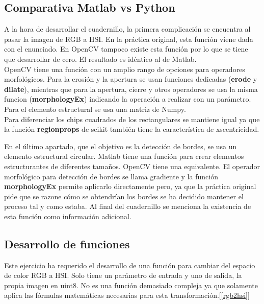 \documentclass[a4paper,12pt]{report}
\begin{document}
\subsection{Comparativa Matlab vs Python}

A la hora de desarrollar el cuadernillo, la primera complicación se encuentra al pasar la imagen de RGB a HSI. En la práctica original, esta función viene dada con el enunciado. En OpenCV tampoco existe esta función por lo que  se tiene que desarrollar de cero. El resultado es idéntico al de Matlab.\\

OpenCV tiene una función con un amplio rango de opciones para operadores morfológicos.  Para la erosión y la apertura se usan funciones dedicadas (\textbf{erode} y \textbf{dilate}), mientras que para la apertura, cierre y otros operadores se usa la misma funcion (\textbf{morphologyEx}) indicando la operación a realizar con un parámetro. Para el elemento estructural se usa una matriz de Numpy.\\

Para diferenciar los chips cuadrados de los rectangulares se mantiene igual ya que la función \textbf{regionprops} de scikit también tiene la característica de xscentricidad.

En el último apartado, que el objetivo es la detección de bordes, se usa un elemento estructural circular. Matlab  tiene una función para crear elementos  estructurantes de diferentes tamaños. OpenCV tiene una equivalente. El operador morfológico para detección de bordes se llama gradiente y la función \textbf{morphologyEx} permite aplicarlo directamente pero, ya que la práctica original pide que se razone cómo se obtendrían los bordes se ha decidido mantener el proceso tal y como estaba. Al final del cuadernillo se menciona la existencia de esta función como información adicional.

\subsection{Desarrollo de funciones}

Este ejercicio ha requerido el desarrollo de una función para cambiar del espacio de color RGB a HSI. Solo tiene un parámetro de entrada y uno de salida, la propia imagen en uint8. No es una función demasiado compleja ya que solamente aplica las fórmulas matemáticas necesarias para esta transformación.[\ref{rgb2hsi}]
\end{document}
